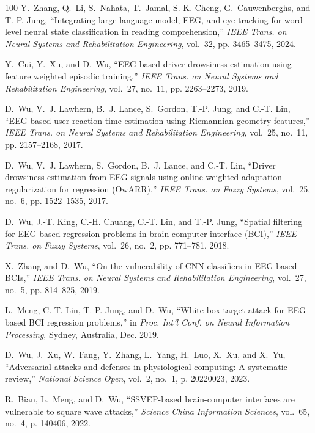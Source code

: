 \documentclass[journal]{IEEEtran}
\begin{document}
\begin{thebibliography}{100}
Y.~Zhang, Q.~Li, S.~Nahata, T.~Jamal, S.-K. Cheng, G.~Cauwenberghs, and T.-P.
  Jung, ``Integrating large language model, {EEG}, and eye-tracking for
  word-level neural state classification in reading comprehension,'' \emph{IEEE
  Trans. on Neural Systems and Rehabilitation Engineering}, vol.~32, pp.
  3465--3475, 2024.

Y.~Cui, Y.~Xu, and D.~Wu, ``{EEG}-based driver drowsiness estimation using
  feature weighted episodic training,'' \emph{IEEE Trans. on Neural Systems and
  Rehabilitation Engineering}, vol.~27, no.~11, pp. 2263--2273, 2019.

D.~Wu, V.~J. Lawhern, B.~J. Lance, S.~Gordon, T.-P. Jung, and C.-T. Lin,
  ``{EEG}-based user reaction time estimation using {R}iemannian geometry
  features,'' \emph{{IEEE} Trans. on Neural Systems and Rehabilitation
  Engineering}, vol.~25, no.~11, pp. 2157--2168, 2017.

D.~Wu, V.~J. Lawhern, S.~Gordon, B.~J. Lance, and C.-T. Lin, ``Driver
  drowsiness estimation from {EEG} signals using online weighted adaptation
  regularization for regression ({OwARR}),'' \emph{{IEEE} Trans. on Fuzzy
  Systems}, vol.~25, no.~6, pp. 1522--1535, 2017.

D.~Wu, J.-T. King, C.-H. Chuang, C.-T. Lin, and T.-P. Jung, ``Spatial filtering
  for {EEG}-based regression problems in brain-computer interface ({BCI}),''
  \emph{{IEEE} Trans. on Fuzzy Systems}, vol.~26, no.~2, pp. 771--781, 2018.

X.~Zhang and D.~Wu, ``On the vulnerability of {CNN} classifiers in {EEG}-based
  {BCIs},'' \emph{{IEEE} Trans. on Neural Systems and Rehabilitation
  Engineering}, vol.~27, no.~5, pp. 814--825, 2019.

L.~Meng, C.-T. Lin, T.-P. Jung, and D.~Wu, ``White-box target attack for
  {EEG}-based {BCI} regression problems,'' in \emph{Proc. Int'l Conf. on Neural
  Information Processing}, Sydney, Australia, Dec. 2019.

D.~Wu, J.~Xu, W.~Fang, Y.~Zhang, L.~Yang, H.~Luo, X.~Xu, and X.~Yu,
  ``Adversarial attacks and defenses in physiological computing: A systematic
  review,'' \emph{National Science Open}, vol.~2, no.~1, p. 20220023, 2023.

R.~Bian, L.~Meng, and D.~Wu, ``{SSVEP}-based brain-computer interfaces are
  vulnerable to square wave attacks,'' \emph{Science China Information
  Sciences}, vol.~65, no.~4, p. 140406, 2022.


\end{thebibliography}
\end{document}
